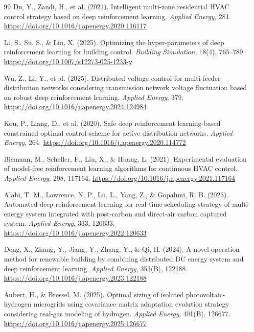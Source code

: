 \begin{thebibliography}{99}
Du, Y., Zandi, H., et al. (2021). Intelligent multi-zone residential HVAC control strategy based on deep reinforcement learning. \textit{Applied Energy}, 281. \url{https://doi.org/10.1016/j.apenergy.2020.116117}

Li, S., Su, S., \& Lin, X. (2025). Optimizing the hyper-parameters of deep reinforcement learning for building control. \textit{Building Simulation}, 18(4), 765--789. \url{https://doi.org/10.1007/s12273-025-1233-y}

Wu, Z., Li, Y., et al. (2025). Distributed voltage control for multi-feeder distribution networks considering transmission network voltage fluctuation based on robust deep reinforcement learning. \textit{Applied Energy}, 379. \url{https://doi.org/10.1016/j.apenergy.2024.124984}

Kou, P., Liang, D., et al. (2020). Safe deep reinforcement learning-based constrained optimal control scheme for active distribution networks. \textit{Applied Energy}, 264. \url{https://doi.org/10.1016/j.apenergy.2020.114772}

Biemann, M., Scheller, F., Liu, X., \& Huang, L. (2021). Experimental evaluation of model-free reinforcement learning algorithms for continuous HVAC control. \textit{Applied Energy}, 298, 117164. \url{https://doi.org/10.1016/j.apenergy.2021.117164}

Alabi, T. M., Lawrence, N. P., Lu, L., Yang, Z., \& Gopaluni, R. B. (2023). Automated deep reinforcement learning for real-time scheduling strategy of multi-energy system integrated with post-carbon and direct-air carbon captured system. \textit{Applied Energy}, 333, 120633. \url{https://doi.org/10.1016/j.apenergy.2022.120633}

Deng, X., Zhang, Y., Jiang, Y., Zhang, Y., \& Qi, H. (2024). A novel operation method for renewable building by combining distributed DC energy system and deep reinforcement learning. \textit{Applied Energy}, 353(B), 122188. \url{https://doi.org/10.1016/j.apenergy.2023.122188}

Aubert, H., \& Bressel, M. (2025). Optimal sizing of isolated photovoltaic-hydrogen microgrids using covariance matrix adaptation evolution strategy considering real-gas modeling of hydrogen. \textit{Applied Energy}, 401(B), 126677. \url{https://doi.org/10.1016/j.apenergy.2025.126677}

\end{thebibliography}
